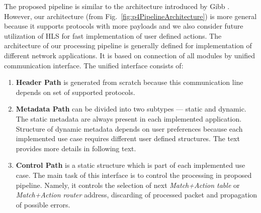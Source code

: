 The proposed pipeline is similar to the architecture introduced by Gibb \cite{GibbPhd}. 
However, our architecture (from Fig.~\ref{fig:p4PipelineArchitecture}) is more general because it supports protocols with more payloads and we also consider 
future utilization of HLS for fast implementation of user defined actions. 
The architecture of our processing pipeline is generally defined for implementation of different network applications. 
It is based on connection of all modules by unified communication interface. The unified interface consists of:
\begin{enumerate}
    \item \textbf{Header Path} is generated from scratch because this communication line depends on set of supported protocols. 
    \item \textbf{Metadata Path} can be divided into two subtypes --- static and dynamic. The static metadata are always present in 
    each implemented application.
    Structure of dynamic metadata depends on user preferences because each implemented use case requires different user defined structures.
    The text provides more details in following text.
    \item \textbf{Control Path} is a static structure which is part of each implemented use case. 
    The main task of this interface is to control the processing in proposed pipeline. 
    Namely, it controls the selection of next \emph{Match+Action table} or \textit{Match+Action router} address,
    discarding of processed packet and propagation of possible errors. 
\end{enumerate}


